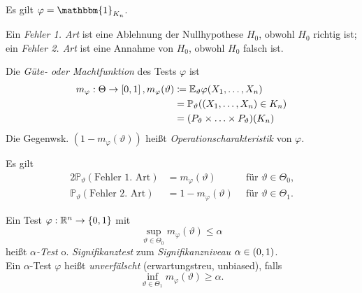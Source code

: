 \documentclass{cheat-sheet}
\renewcommand{\P}{\mathbb{P}} %
\newcommand{\E}{\mathbb{E}} %
\newcommand{\ind}{\mathbbm{1}} %
\begin{document}
\begin{bem}
  Es gilt $\varphi = \ind_{K_n}$.
\end{bem}

\begin{defn}
  Ein \emph{Fehler 1. Art} ist eine Ablehnung der Nullhypothese $H_0$, obwohl $H_0$ richtig ist;
  ein \emph{Fehler 2. Art} ist eine Annahme von $H_0$, obwohl $H_0$ falsch ist.
\end{defn}


\begin{defn}
  Die \emph{Güte- oder Machtfunktion} des Tests $\varphi$ ist
  \begin{align*}
    m_\varphi : \Theta \to \cinterval{0}{1},
    m_\varphi(\vartheta) & \coloneqq
    \E_\vartheta \varphi(X_1, \ldots, X_n) \\
    & = \P_\vartheta ((X_1, \ldots, X_n) \in K_n) \\
    & = (P_\vartheta \times \ldots \times P_\vartheta)(K_n)
  \end{align*}
  Die Gegenwsk. $(1 {-} m_\varphi(\vartheta))$ heißt \emph{Operationscharakteristik} von $\varphi$.
\end{defn}

\begin{bem}
  Es gilt
  \begin{alignat*}{2}
    \P_\vartheta(\text{Fehler 1. Art}) &= m_\varphi(\vartheta) & \enspace\text{für $\vartheta \in \Theta_0$,} \\
    \P_\vartheta(\text{Fehler 2. Art}) &= 1 - m_\varphi(\vartheta) & \enspace\text{für $\vartheta \in \Theta_1$.}
  \end{alignat*}
\end{bem}


\begin{defn}
  Ein Test $\varphi : \mathbb{R}^n \to \{ 0, 1 \}$ mit
  \[ \sup_{\vartheta \in \Theta_0} m_\varphi(\vartheta) \leq \alpha \]
  heißt \emph{$\alpha$-Test} o. \emph{Signifikanztest} zum \emph{Signifikanzniveau} $\alpha \in \left( 0, 1 \right)$. \\[2pt]
  Ein $\alpha$-Test $\varphi$ heißt \emph{unverfälscht} (erwartungstreu, unbiased), falls
  \[ \inf_{\vartheta \in \Theta_1} m_\varphi(\vartheta) \geq \alpha. \]
\end{defn}

\end{document}
